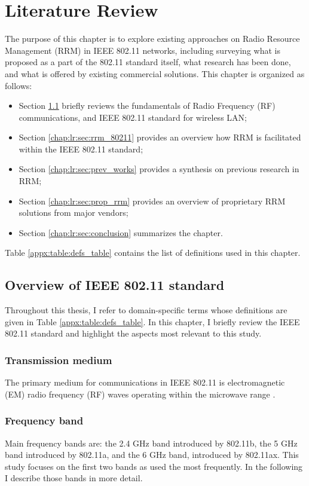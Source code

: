 \chapter{Literature Review}
\label{chap:lr}
\chaptermark{}
The purpose of this chapter is to explore existing approaches on Radio Resource Management (RRM) in IEEE 802.11 networks, including surveying what is proposed as a part of the 802.11 standard itself, what research has been done, and what is offered by existing commercial solutions. This chapter is organized as follows:
\begin{itemize}
    \item Section \ref{chap:lr:sec:80211_overview} briefly reviews the fundamentals of Radio Frequency (RF) communications, and IEEE 802.11 standard for wireless LAN;
    \item Section \ref{chap:lr:sec:rrm_80211} provides an overview how RRM is facilitated within the IEEE 802.11 standard;
    \item Section \ref{chap:lr:sec:prev_works} provides a synthesis on previous research in RRM;
    \item Section \ref{chap:lr:sec:prop_rrm} provides an overview of proprietary RRM solutions from major vendors;
    \item Section \ref{chap:lr:sec:conclusion} summarizes the chapter.
\end{itemize}
Table \ref{appx:table:defs_table} contains the list of definitions used in this chapter.

\section{Overview of IEEE 802.11 standard}
\label{chap:lr:sec:80211_overview}

Throughout this thesis, I refer to domain-specific terms whose definitions are given in Table \ref{appx:table:defs_table}. In this chapter, I briefly review the IEEE 802.11 standard and highlight the aspects most relevant to this study.


\subsection{Transmission medium}

The primary medium for communications in IEEE 802.11 is electromagnetic (EM) radio frequency (RF) waves operating within the microwave range \cite{colemanCWNACertifiedWireless2021}.

\subsection{Frequency band}
Main frequency bands are: the 2.4 GHz band introduced by 802.11b, the 5 GHz band introduced by 802.11a, and the 6 GHz band, introduced by 802.11ax. This study focuses on the first two bands as used the most frequently. In the following I describe those bands in more detail.

